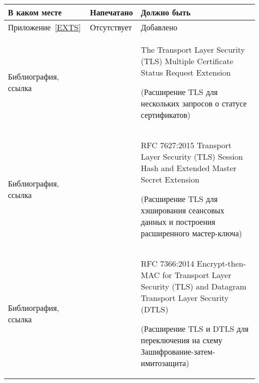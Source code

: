 \begin{center}
\begin{tabular}{|p{3.5cm}|p{6cm}|p{6cm}|}
\hline
В каком месте & Напечатано & Должно быть\\
\hline
%
\hline
Приложение~\ref{EXTS} &
Отсутствует &
Добавлено
\\
%
\hline
Библиография, ссылка~\cite{RFC6961} &
&
The Transport Layer Security (TLS) Multiple Certificate Status 
Request Extension\par
{\small (Расширение TLS для нескольких запросов о статусе сертификатов)}
\\
%
\hline
Библиография, ссылка~\cite{RFC7627} &
&
RFC 7627:2015
Transport Layer Security (TLS) Session Hash and Extended Master Secret 
Extension\par
{\small (Расширение TLS для хэширования сеансовых данных и построения 
расширенного мастер-ключа)}
\\
%
\hline
Библиография, ссылка~\cite{RFC7366} &
&
RFC 7366:2014
Encrypt-then-MAC for Transport Layer Security (TLS) and Datagram Transport 
Layer Security (DTLS)\par
{\small (Расширение TLS и DTLS для переключения на схему 
Зашифрование-затем-имитозащита)}
\\
\hline
\end{tabular}
\end{center}